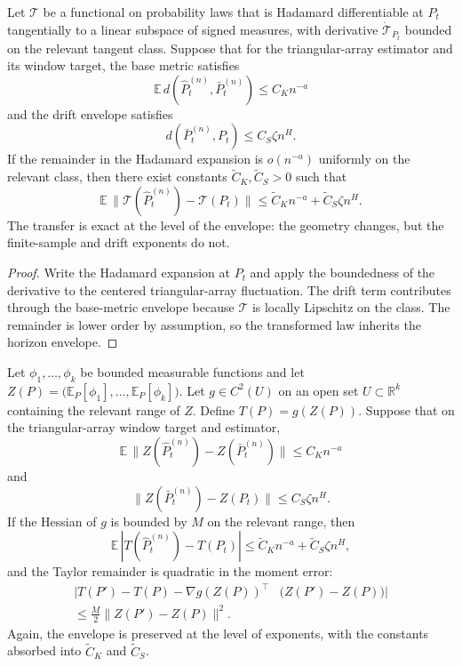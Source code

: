 \begin{proposition}
\label{prop:hadamard_triangular_transfer}
Let $\mathcal T$ be a functional on probability laws that is Hadamard
differentiable at $P_t$ tangentially to a linear subspace of signed measures, with
derivative $\dot{\mathcal T}_{P_t}$ bounded on the relevant tangent class. Suppose
that for the triangular-array estimator and its window target, the base metric
satisfies
\[
  \mathbb E\,d\!\left(\widehat P_t^{(n)},\bar P_t^{(n)}\right) \le C_K n^{-a}
\]
and the drift envelope satisfies
\[
  d\!\left(\bar P_t^{(n)},P_t\right) \le C_S\zeta n^H.
\]
If the remainder in the Hadamard expansion is $o(n^{-a})$ uniformly on the
relevant class, then there exist constants $\widetilde C_K,\widetilde C_S>0$
such that
\[
  \mathbb E\,\bigl\|\mathcal T(\widehat P_t^{(n)})-\mathcal T(P_t)\bigr\|
  \le \widetilde C_K n^{-a} + \widetilde C_S\zeta n^H.
\]
The transfer is exact at the level of the envelope: the geometry changes, but the
finite-sample and drift exponents do not.
\end{proposition}

\begin{proof}
Write the Hadamard expansion at $P_t$ and apply the boundedness of the derivative
to the centered triangular-array fluctuation. The drift term contributes through
the base-metric envelope because $\mathcal T$ is locally Lipschitz on
the class. The remainder is lower order by assumption, so the transformed law
inherits the horizon envelope.
\end{proof}

\begin{proposition}
\label{prop:smooth_finite_dimensional_transfer}
Let $\phi_1,\dots,\phi_k$ be bounded measurable functions and let
$Z(P)=\bigl(\mathbb E_P[\phi_1],\dots,\mathbb E_P[\phi_k]\bigr)$. Let
$g\in C^2(U)$ on an open set $U\subset\mathbb R^k$ containing the relevant
range of $Z$. Define $T(P)=g(Z(P))$. Suppose that on the triangular-array window
target and estimator,
\[
  \mathbb E\,\|Z(\widehat P_t^{(n)})-Z(\bar P_t^{(n)})\| \le C_K n^{-a}
\]
and
\[
  \|Z(\bar P_t^{(n)})-Z(P_t)\| \le C_S\zeta n^H.
\]
If the Hessian of $g$ is bounded by $M$ on the relevant range, then
\[
  \mathbb E\,|T(\widehat P_t^{(n)})-T(P_t)|
  \le \widetilde C_K n^{-a} + \widetilde C_S\zeta n^H,
\]
and the Taylor remainder is quadratic in the moment error:
\[
  \begin{aligned}
  |T(P')-T(P)-\nabla g(Z(P))^\top &\bigl(Z(P')-Z(P)\bigr)| \\
  \le \frac{M}{2}\|Z(P')-Z(P)\|^2.
  \end{aligned}
\]
Again, the envelope is preserved at the level of exponents, with the constants
absorbed into $\widetilde C_K$ and $\widetilde C_S$.
\end{proposition}


